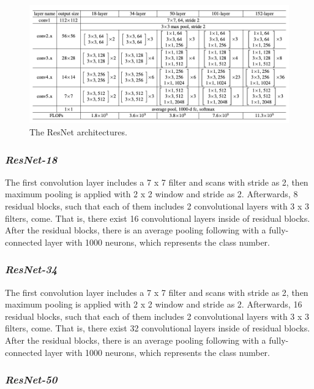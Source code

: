 \begin{figure}[h]
    \centering
    \includegraphics[width=\linewidth]{fig/resnet_archs.png}
    \vspace*{1mm}
    \caption{The ResNet architectures\cite{ResNet}.}
    \label{fig:resnet_archs}
\end{figure}

\subsubsection*{\textit{ResNet-18}}

The first convolution layer includes a 7 x 7 filter and scans with stride as 2, then maximum pooling is applied with 2 x 2 window and stride as 2. Afterwards, 8 residual blocks, such that each of them includes 2 convolutional layers with 3 x 3 filters, come. That is, there exist 16 convolutional layers inside of residual blocks. After the residual blocks, there is an average pooling following with a fully-connected layer with 1000 neurons, which represents the class number.

\subsubsection*{\textit{ResNet-34}}

The first convolution layer includes a 7 x 7 filter and scans with stride as 2, then maximum pooling is applied with 2 x 2 window and stride as 2. Afterwards, 16 residual blocks, such that each of them includes 2 convolutional layers with 3 x 3 filters, come. That is, there exist 32 convolutional layers inside of residual blocks. After the residual blocks, there is an average pooling following with a fully-connected layer with 1000 neurons, which represents the class number.

\subsubsection*{\textit{ResNet-50}}


